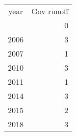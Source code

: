 \footnotesize\begin{tabular}[t]{lr}
\toprule
\multicolumn{1}{c}{year} & \multicolumn{1}{c}{Gov runoff} \\
\cmidrule(l{3pt}r{3pt}){1-1} \cmidrule(l{3pt}r{3pt}){2-2}
  & 0\\
\midrule
2006 & 3\\
2007 & 1\\
2010 & 3\\
2011 & 1\\
2014 & 3\\
2015 & 2\\
2018 & 3\\
\bottomrule
\end{tabular}
